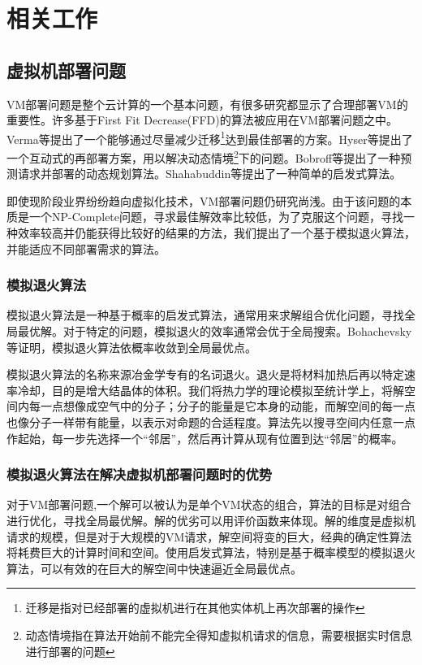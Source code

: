 
\chapter{相关工作}
\label{chap:2}

\section{虚拟机部署问题}

VM部署问题是整个云计算的一个基本问题，有很多研究都显示了合理部署VM的重要性\cite{Grit06}\cite{Bian04}。许多基于First Fit Decrease(FFD)的算法被应用在VM部署问题之中。Verma等\cite{Verm08}提出了一个能够通过尽量减少迁移\footnote{迁移是指对已经部署的虚拟机进行在其他实体机上再次部署的操作}达到最佳部署的方案。Hyser等\cite{Hyse07}提出了一个互动式的再部署方案，用以解决动态情境\footnote{动态情境指在算法开始前不能完全得知虚拟机请求的信息，需要根据实时信息进行部署的问题}下的问题。Bobroff等\cite{Bobr07}提出了一种预测请求并部署的动态规划算法。Shahabuddin等\cite{Shah01}提出了一种简单的启发式算法。

即使现阶段业界纷纷趋向虚拟化技术，VM部署问题仍研究尚浅。由于该问题的本质是一个NP-Complete问题，寻求最佳解效率比较低，为了克服这个问题，寻找一种效率较高并仍能获得比较好的结果的方法，我们提出了一个基于模拟退火算法，并能适应不同部署需求的算法。

\subsection*{模拟退火算法}
\label{sec:sa-inro}

模拟退火算法是一种基于概率的启发式算法，通常用来求解组合优化问题，寻找全局最优解。对于特定的问题，模拟退火的效率通常会优于全局搜索。Bohachevsky等证明，模拟退火算法依概率收敛到全局最优点。

模拟退火算法的名称来源冶金学专有的名词退火。退火是将材料加热后再以特定速率冷却，目的是增大结晶体的体积。我们将热力学的理论模拟至统计学上，将解空间内每一点想像成空气中的分子；分子的能量是它本身的动能，而解空间的每一点也像分子一样带有能量，以表示对命题的合适程度。算法先以搜寻空间内任意一点作起始，每一步先选择一个``邻居''，然后再计算从现有位置到达``邻居''的概率。

\subsection*{模拟退火算法在解决虚拟机部署问题时的优势}
\label{sec:advantage-of-sa}

对于VM部署问题,一个解可以被认为是单个VM状态的组合，算法的目标是对组合进行优化，寻找全局最优解。解的优劣可以用评价函数来体现。解的维度是虚拟机请求的规模，但是对于大规模的VM请求，解空间将变的巨大，经典的确定性算法将耗费巨大的计算时间和空间。使用启发式算法，特别是基于概率模型的模拟退火算法，可以有效的在巨大的解空间中快速逼近全局最优点。



